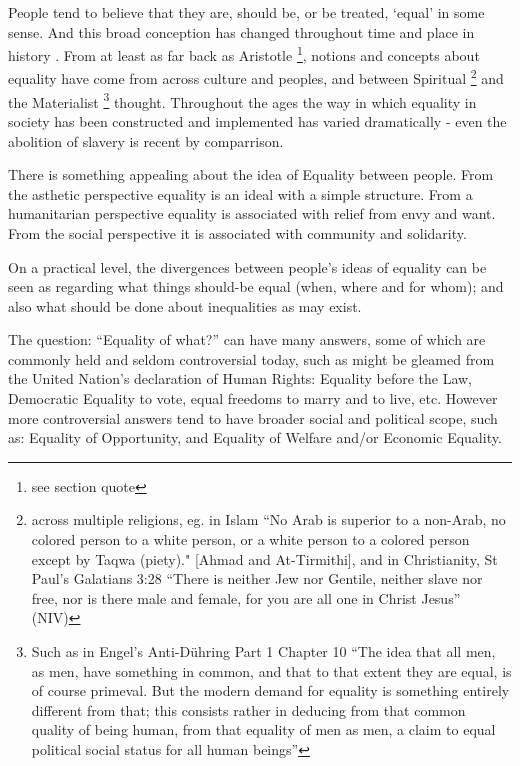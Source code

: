 People tend to believe that they are, should be, or be treated, `equal' in some sense.
And this broad conception has changed throughout time and place in history \cite{themeaningofequalitycapaldi}.
From at least as far back as Aristotle \cite{AristotleGutenberg}\footnote{see section quote}, notions and concepts about equality have come from across culture and peoples, and between Spiritual \footnote{across multiple religions, eg. in Islam ``No Arab is superior to a non-Arab, no colored person to a  white person, or a white person to a colored person except by Taqwa (piety)." [Ahmad and At-Tirmithi], and in Christianity, St Paul's Galatians 3:28 ``There is neither Jew nor Gentile, neither slave nor free, nor is there male and female, for you are all one in Christ Jesus'' (NIV) } and the Materialist \footnote{Such as in Engel's Anti-D\"{u}hring Part 1 Chapter 10 ``The idea that all men, as men, have something in common, and that to that extent they are equal, is of course primeval. But the modern demand for equality is something entirely different from that; this consists rather in deducing from that common quality of being human, from that equality of men as men, a claim to equal political social status for all human beings''} thought.
Throughout the ages the way in which equality in society has been constructed and implemented has varied dramatically - even the abolition of slavery is recent by comparrison.

There is something appealing about the idea of Equality between people.
From the asthetic perspective equality is an ideal with a simple structure. From a humanitarian perspective equality is associated with relief from envy and want. From the social perspective it is associated with community and solidarity.%


On a practical level, the divergences between people's ideas of equality can be seen as regarding what things should-be equal (when, where and for whom); and also what should be done about inequalities as may exist.

The question: ``Equality of what?'' can have many answers, some of which are commonly held and seldom controversial today, such as might be gleamed from the United Nation's declaration of Human Rights: Equality before the Law, Democratic Equality to vote, equal freedoms to marry and to live, etc.
However more controversial answers tend to have broader social and political scope, such as: Equality of Opportunity, and Equality of Welfare and/or Economic Equality.%

